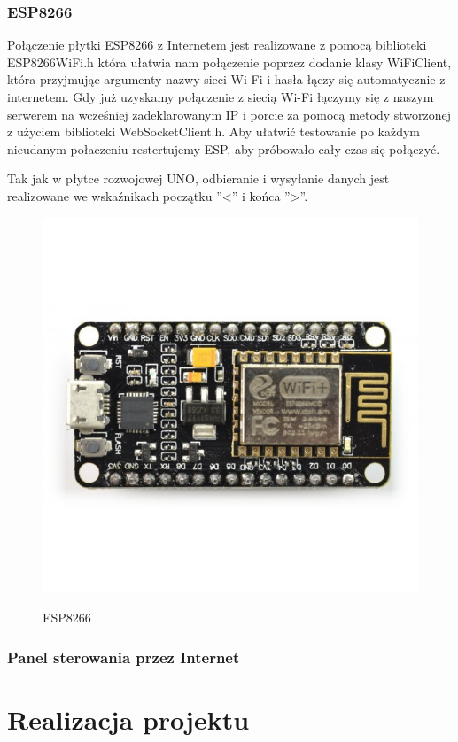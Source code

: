 \documentclass[12pt]{article}
\begin{document}
\subsubsection{ESP8266}
Połączenie płytki ESP8266 z Internetem jest realizowane z pomocą biblioteki ESP8266WiFi.h która ułatwia nam połączenie poprzez dodanie klasy WiFiClient, która przyjmując argumenty nazwy sieci Wi-Fi i hasła łączy się automatycznie z internetem.
Gdy już uzyskamy połączenie z siecią Wi-Fi łączymy się z naszym serwerem na wcześniej zadeklarowanym IP i porcie za pomocą metody stworzonej z użyciem biblioteki WebSocketClient.h.
Aby ułatwić testowanie po każdym nieudanym połaczeniu restertujemy ESP, aby próbowało cały czas się połączyć.

Tak jak w płytce rozwojowej UNO, odbieranie i wysyłanie danych jest realizowane we wskaźnikach początku ''<'' i końca ''>''.
\begin{figure}[!h]
	\begin{center}
		{\includegraphics[width=12cm]{esp8266_photo.png}}
	\end{center}
	\caption{ESP8266}
\end{figure}
\subsubsection{Panel sterowania przez Internet}


\section{Realizacja projektu}
\end{document}
